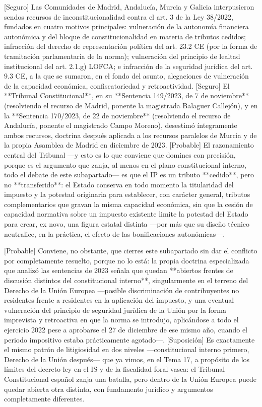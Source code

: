 \documentclass[10pt,a4paper]{article}
\begin{document}
[Seguro] Las Comunidades de Madrid, Andalucía, Murcia y Galicia interpusieron sendos recursos de inconstitucionalidad contra el art. 3 de la Ley 38/2022, fundados en cuatro motivos principales: vulneración de la autonomía financiera autonómica y del bloque de constitucionalidad en materia de tributos cedidos; infracción del derecho de representación política del art. 23.2 CE (por la forma de tramitación parlamentaria de la norma); vulneración del principio de lealtad institucional del art. 2.1.g) LOFCA; e infracción de la seguridad jurídica del art. 9.3 CE, a la que se sumaron, en el fondo del asunto, alegaciones de vulneración de la capacidad económica, confiscatoriedad y retroactividad. [Seguro] El **Tribunal Constitucional**, en su **Sentencia 149/2023, de 7 de noviembre** (resolviendo el recurso de Madrid, ponente la magistrada Balaguer Callejón), y en la **Sentencia 170/2023, de 22 de noviembre** (resolviendo el recurso de Andalucía, ponente el magistrado Campo Moreno), desestimó íntegramente ambos recursos, doctrina después aplicada a los recursos paralelos de Murcia y de la propia Asamblea de Madrid en diciembre de 2023. [Probable] El razonamiento central del Tribunal —y esto es lo que conviene que domines con precisión, porque es el argumento que zanja, al menos en el plano constitucional interno, todo el debate de este subapartado— es que el IP es un tributo **cedido**, pero no **transferido**: el Estado conserva en todo momento la titularidad del impuesto y la potestad originaria para establecer, con carácter general, tributos complementarios que gravan la misma capacidad económica, sin que la cesión de capacidad normativa sobre un impuesto existente limite la potestad del Estado para crear, ex novo, una figura estatal distinta —por más que su diseño técnico neutralice, en la práctica, el efecto de las bonificaciones autonómicas—.

[Probable] Conviene, no obstante, que cierres este subapartado sin dar el conflicto por completamente resuelto, porque no lo está: la propia doctrina especializada que analizó las sentencias de 2023 señala que quedan **abiertos frentes de discusión distintos del constitucional interno**, singularmente en el terreno del Derecho de la Unión Europea —posible discriminación de contribuyentes no residentes frente a residentes en la aplicación del impuesto, y una eventual vulneración del principio de seguridad jurídica de la Unión por la forma imprevista y retroactiva en que la norma se introdujo, aplicándose a todo el ejercicio 2022 pese a aprobarse el 27 de diciembre de ese mismo año, cuando el periodo impositivo estaba prácticamente agotado—. [Suposición] Es exactamente el mismo patrón de litigiosidad en dos niveles —constitucional interno primero, Derecho de la Unión después— que ya vimos, en el Tema 17, a propósito de los límites del decreto-ley en el IS y de la fiscalidad foral vasca: el Tribunal Constitucional español zanja una batalla, pero dentro de la Unión Europea puede quedar abierta otra distinta, con fundamento jurídico y argumentos completamente diferentes.
\end{document}
